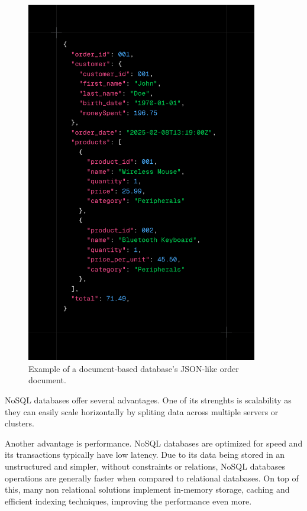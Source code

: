 \begin{figure}[htbp]
	\centering
	\includegraphics[width=0.9\textwidth, height=0.5\textheight, keepaspectratio]{Chapters/Figures/Databases/NoSQL.png}
	\caption{Example of a document-based database's \gls{JSON}-like order document.}
	\label{fig:databases:NoSQL}
\end{figure}

\gls{NoSQL} databases offer several advantages. One of its strenghts is scalability
as they can easily scale horizontally by spliting data across
multiple servers or clusters\cite{Yadav2024}.

Another advantage is performance. \gls{NoSQL} databases are optimized for speed
and its transactions typically have low latency. Due to its data being stored
in an unstructured and simpler, without constraints or relations, \gls{NoSQL}
databases operations are generally faster when compared to relational databases.
On top of this, many non relational solutions implement in-memory storage,
caching and efficient indexing techniques, improving the performance even more.

